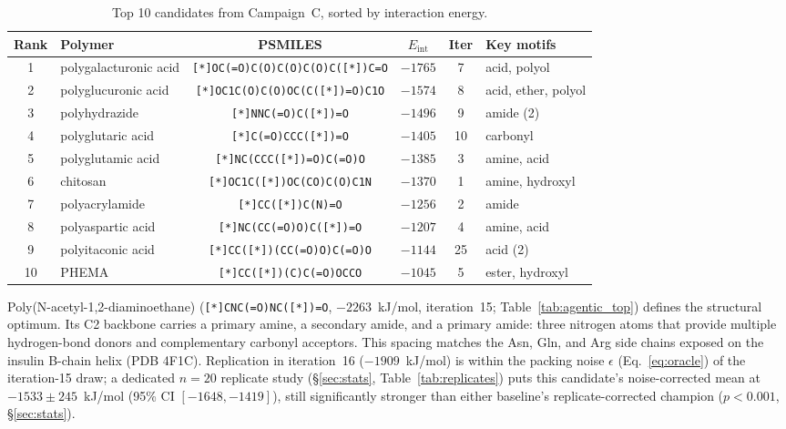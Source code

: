 \documentclass[twocolumn]{fairmeta}
\begin{document}
\begin{table}[t]
\centering
\caption{Top 10 candidates from Campaign~C, sorted by interaction energy.}
\label{tab:agentic_top_c}
\small
\begin{tabular}{clcccl}
\toprule
\textbf{Rank} & \textbf{Polymer} & \textbf{PSMILES} & \textbf{$E_\text{int}$} & \textbf{Iter} & \textbf{Key motifs} \\
\midrule
1  & polygalacturonic acid & \texttt{\footnotesize [*]OC(=O)C(O)C(O)C(O)C([*])C=O} & $-1765$ & 7 & acid, polyol \\
2  & polyglucuronic acid & \texttt{\footnotesize [*]OC1C(O)C(O)OC(C([*])=O)C1O} & $-1574$ & 8 & acid, ether, polyol \\
3  & polyhydrazide & \texttt{\footnotesize [*]NNC(=O)C([*])=O} & $-1496$ & 9 & amide (2) \\
4  & polyglutaric acid & \texttt{\footnotesize [*]C(=O)CCC([*])=O} & $-1405$ & 10 & carbonyl \\
5  & polyglutamic acid & \texttt{\footnotesize [*]NC(CCC([*])=O)C(=O)O} & $-1385$ & 3 & amine, acid \\
6  & chitosan & \texttt{\footnotesize [*]OC1C([*])OC(CO)C(O)C1N} & $-1370$ & 1 & amine, hydroxyl \\
7  & polyacrylamide & \texttt{\footnotesize [*]CC([*])C(N)=O} & $-1256$ & 2 & amide \\
8  & polyaspartic acid & \texttt{\footnotesize [*]NC(CC(=O)O)C([*])=O} & $-1207$ & 4 & amine, acid \\
9  & polyitaconic acid & \texttt{\footnotesize [*]CC([*])(CC(=O)O)C(=O)O} & $-1144$ & 25 & acid (2) \\
10 & PHEMA & \texttt{\footnotesize [*]CC([*])(C)C(=O)OCCO} & $-1045$ & 5 & ester, hydroxyl \\
\bottomrule
\end{tabular}
\end{table}

Poly(N-acetyl-1,2-diaminoethane) (\texttt{[*]CNC(=O)NC([*])=O}, $-2263$~kJ/mol, iteration~15; Table~\ref{tab:agentic_top}) defines the structural optimum.
Its C2 backbone carries a primary amine, a secondary amide, and a primary amide: three nitrogen atoms that provide multiple hydrogen-bond donors and complementary carbonyl acceptors.
This spacing matches the Asn, Gln, and Arg side chains exposed on the insulin B-chain helix (PDB 4F1C).
Replication in iteration~16 ($-1909$~kJ/mol) is within the packing noise $\epsilon$ (Eq.~\ref{eq:oracle}) of the iteration-15 draw; a dedicated $n{=}20$ replicate study (\S\ref{sec:stats}, Table~\ref{tab:replicates}) puts this candidate's noise-corrected mean at $-1533 \pm 245$~kJ/mol (95\% CI $[-1648,-1419]$), still significantly stronger than either baseline's replicate-corrected champion ($p<0.001$, \S\ref{sec:stats}).
\end{document}
